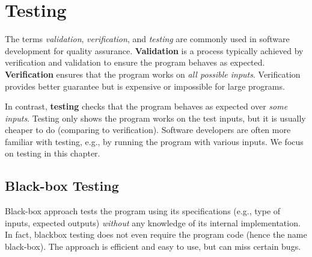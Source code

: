 \documentclass[oneside,11pt,dvipsnames]{book}
\begin{document}
\chapter{Testing}\label{chapter:testing}


The terms \emph{validation}, \emph{verification}, and \emph{testing} are commonly used in software development for quality assurance. \textbf{Validation} is a process typically achieved by verification and validation to ensure the program behaves as expected. \textbf{Verification} ensures that the program works on \emph{all possible inputs}. Verification provides better guarantee but is expensive or impossible for large programs.

In contrast, \textbf{testing} checks that the program behaves as expected over \emph{some inputs}. Testing only shows the program works on the test inputs, but it is usually cheaper to do (comparing to verification). Software developers are often more familiar with testing, e.g., by running the program with various inputs. We focus on testing in this chapter.  


\section{Black-box Testing}\label{sec:blackbox}

Black-box approach tests the program using its specifications (e.g., type of inputs, expected outputs) \emph{without} any knowledge of its internal implementation. In fact, blackbox testing does not even require the program code (hence the name black-box).  The approach is efficient and easy to use, but can miss certain bugs.
\end{document}
